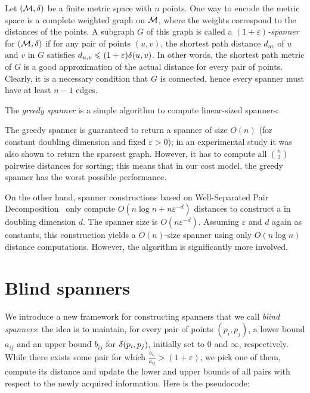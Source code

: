 \documentclass[]{ws-ijcga}
\renewcommand{\leq}{\leqslant}
\newcommand{\eps}{\varepsilon}
\begin{document}
%
Let $(\mathcal{M}, \delta)$ be a finite metric space with $n$ points. 
One way to encode the metric space is a complete weighted graph on $\mathcal{M}$,
where the weights correspond to the distances of the points.
A subgraph $G$ of this graph is called a \emph{$(1+\eps)$-spanner} for $(\mathcal{M},\delta)$ 
if for any pair of points $(u,v)$,
the shortest path distance $d_{uv}$ of $u$ and $v$ in $G$ satisfies $d_{u,v}\leq (1+\eps)\dist(u,v)$.
In other words, the shortest path metric of $G$ is a good approximation of the actual distance for every pair of points.
Clearly, it is a necessary condition that $G$ is connected, hence every spanner must have at least $n-1$ edges.

The \emph{greedy spanner} \cite{althofer1993sparse} is a simple algorithm to compute linear-sized spanners:
\begin{algorithmic}
\label{alg:greedy_spanner}
\Function{GreedySpanner}{$P, \eps$}
    \If{$d_{ij}>(1+\eps)\dist(p_i,p_j)$}
    \EndIf
    \EndFor
\EndFunction
\end{algorithmic}

The greedy spanner is guaranteed \cite{althofer1993sparse} to return a spanner of size $O(n)$
(for constant doubling dimension and fixed $\eps>0$); in an experimental study \cite{farshi2009experimental}
it was also shown to return the sparsest graph.  However, it
has to compute all $\binom{n}{2}$ pairwise distances for sorting;
this means that in our cost model, the greedy spanner has the worst possible
performance.

On the other hand, spanner constructions based on Well-Separated Pair Decomposition~\cite{cal-kos-wspd,hm-fast} only compute
$O(n\log n+n \eps^{-d})$ distances 
to construct a {\espanner} in doubling dimension $d$.
The spanner size is $O(n\eps^{-d})$. Assuming $\eps$ and $d$ again as constants,
this construction yields a $O(n)$-size spanner using only $O(n\log n)$ distance
computations. However, the algorithm is significantly more involved.

\section{Blind spanners}
\label{sec:blind_spanners}
%
We introduce a new framework for constructing spanners
that we call \emph{blind spanners}: the idea is to maintain,
for every pair of points $(p_i,p_j)$,
a lower bound $a_{ij}$ and an upper bound $b_{ij}$ for $\delta(p_i,p_j)$,
initially set to $0$ and $\infty$, respectively. While there exists some pair for which $\frac{b_{ij}}{a_{ij}}>(1+\eps)$,
we pick one of them, compute its distance and update the lower and upper bounds of
all pairs with respect to the newly acquired information. Here is the pseudocode:
\end{document}
